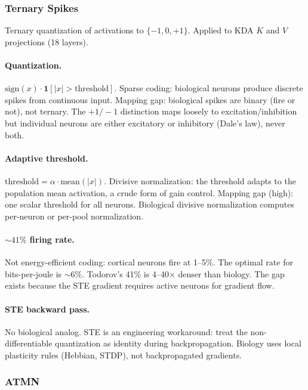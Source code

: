 \documentclass[11pt,a4paper]{article}
\begin{document}
\subsubsection{Ternary Spikes}

Ternary quantization of activations to $\{-1, 0, +1\}$. Applied to KDA $K$ and $V$ projections (18 layers).

\paragraph{Quantization.}
$\mathrm{sign}(x) \cdot \mathbf{1}[|x| > \mathrm{threshold}]$. Sparse coding: biological neurons produce discrete spikes from continuous input. Mapping gap: biological spikes are binary (fire or not), not ternary. The $+1/-1$ distinction maps loosely to excitation/inhibition but individual neurons are either excitatory or inhibitory (Dale's law), never both.

\paragraph{Adaptive threshold.}
$\mathrm{threshold} = \alpha \cdot \mathrm{mean}(|x|)$. Divisive normalization: the threshold adapts to the population mean activation, a crude form of gain control. Mapping gap (high): one scalar threshold for all neurons. Biological divisive normalization computes per-neuron or per-pool normalization.

\paragraph{${\sim}41\%$ firing rate.}
Not energy-efficient coding: cortical neurons fire at 1--5\%. The optimal rate for bits-per-joule is ${\sim}6\%$. Todorov's 41\% is 4--40$\times$ denser than biology. The gap exists because the STE gradient requires active neurons for gradient flow.

\paragraph{STE backward pass.}
No biological analog. STE is an engineering workaround: treat the non-differentiable quantization as identity during backpropagation. Biology uses local plasticity rules (Hebbian, STDP), not backpropagated gradients.

\subsubsection{ATMN}
\end{document}
